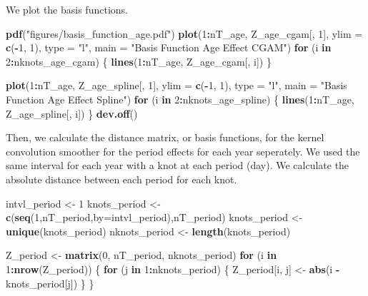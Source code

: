 \documentclass[11pt,]{article}
\newenvironment{Shaded}{\begin{snugshade}}{\end{snugshade}}
\newcommand{\KeywordTok}[1]{\textcolor[rgb]{0.13,0.29,0.53}{\textbf{#1}}}
\newcommand{\DataTypeTok}[1]{\textcolor[rgb]{0.13,0.29,0.53}{#1}}
\newcommand{\DecValTok}[1]{\textcolor[rgb]{0.00,0.00,0.81}{#1}}
\newcommand{\StringTok}[1]{\textcolor[rgb]{0.31,0.60,0.02}{#1}}
\newcommand{\ControlFlowTok}[1]{\textcolor[rgb]{0.13,0.29,0.53}{\textbf{#1}}}
\newcommand{\OperatorTok}[1]{\textcolor[rgb]{0.81,0.36,0.00}{\textbf{#1}}}
\newcommand{\NormalTok}[1]{#1}
\begin{document}
We plot the basis functions.

\begin{Shaded}
\begin{Highlighting}[]
\KeywordTok{pdf}\NormalTok{(}\StringTok{"figures/basis_function_age.pdf"}\NormalTok{)}
\KeywordTok{plot}\NormalTok{(}\DecValTok{1}\OperatorTok{:}\NormalTok{nT_age,}
\NormalTok{     Z_age_cgam[, }\DecValTok{1}\NormalTok{],}
     \DataTypeTok{ylim =} \KeywordTok{c}\NormalTok{(}\OperatorTok{-}\DecValTok{1}\NormalTok{, }\DecValTok{1}\NormalTok{),}
     \DataTypeTok{type =} \StringTok{"l"}\NormalTok{,}
     \DataTypeTok{main =} \StringTok{"Basis Function Age Effect CGAM"}\NormalTok{)}
\ControlFlowTok{for}\NormalTok{ (i }\ControlFlowTok{in} \DecValTok{2}\OperatorTok{:}\NormalTok{nknots_age_cgam) \{}
  \KeywordTok{lines}\NormalTok{(}\DecValTok{1}\OperatorTok{:}\NormalTok{nT_age, Z_age_cgam[, i])}
\NormalTok{\}}

\KeywordTok{plot}\NormalTok{(}\DecValTok{1}\OperatorTok{:}\NormalTok{nT_age,}
\NormalTok{     Z_age_spline[, }\DecValTok{1}\NormalTok{],}
     \DataTypeTok{ylim =} \KeywordTok{c}\NormalTok{(}\OperatorTok{-}\DecValTok{1}\NormalTok{, }\DecValTok{1}\NormalTok{),}
     \DataTypeTok{type =} \StringTok{"l"}\NormalTok{,}
     \DataTypeTok{main =} \StringTok{"Basis Function Age Effect Spline"}\NormalTok{)}
\ControlFlowTok{for}\NormalTok{ (i }\ControlFlowTok{in} \DecValTok{2}\OperatorTok{:}\NormalTok{nknots_age_spline) \{}
  \KeywordTok{lines}\NormalTok{(}\DecValTok{1}\OperatorTok{:}\NormalTok{nT_age, Z_age_spline[, i])}
\NormalTok{\}}
\KeywordTok{dev.off}\NormalTok{()}
\end{Highlighting}
\end{Shaded}

Then, we calculate the distance matrix, or basis functions, for the
kernel convolution smoother for the period effects for each year
seperately. We used the same interval for each year with a knot at each
period (day). We calculate the absolute distance between each period for
each knot.

\begin{Shaded}
\begin{Highlighting}[]
\NormalTok{intvl_period <-}\StringTok{ }\DecValTok{1}
\NormalTok{knots_period <-}\StringTok{ }\KeywordTok{c}\NormalTok{(}\KeywordTok{seq}\NormalTok{(}\DecValTok{1}\NormalTok{,nT_period,}\DataTypeTok{by=}\NormalTok{intvl_period),nT_period)}
\NormalTok{knots_period <-}\StringTok{ }\KeywordTok{unique}\NormalTok{(knots_period)}
\NormalTok{nknots_period <-}\StringTok{ }\KeywordTok{length}\NormalTok{(knots_period)}

\NormalTok{Z_period <-}\StringTok{ }\KeywordTok{matrix}\NormalTok{(}\DecValTok{0}\NormalTok{, nT_period, nknots_period)}
\ControlFlowTok{for}\NormalTok{ (i }\ControlFlowTok{in} \DecValTok{1}\OperatorTok{:}\KeywordTok{nrow}\NormalTok{(Z_period)) \{}
  \ControlFlowTok{for}\NormalTok{ (j }\ControlFlowTok{in} \DecValTok{1}\OperatorTok{:}\NormalTok{nknots_period) \{}
\NormalTok{    Z_period[i, j] <-}\StringTok{ }\KeywordTok{abs}\NormalTok{(i }\OperatorTok{-}\StringTok{ }\NormalTok{knots_period[j])}
\NormalTok{  \}}
\NormalTok{\}}
\end{Highlighting}
\end{Shaded}
\end{document}
